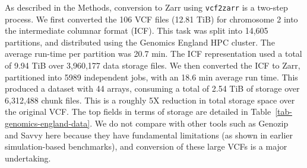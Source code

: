 \documentclass[a4paper,num-refs]{oup-contemporary}
\begin{document}
As described in the Methods, conversion to Zarr using 
\texttt{vcf2zarr} is a two-step process. We 
first converted the 106 VCF files (12.81 TiB) for chromosome 2
into the intermediate columnar format (ICF). This task was 
split into 14,605 partitions, and distributed using the Genomics England
HPC cluster. The average run-time per partition was 20.7 min.
The ICF representation used a total
of 9.94 TiB over 3,960,177 data storage files. 
We then converted the ICF to Zarr, partitioned into
5989 independent jobs, with an 18.6 min average run time.
This produced a dataset with 44 arrays, consuming a 
total of 2.54 TiB of storage over 6,312,488
chunk files. This is a roughly 5X reduction in total storage 
space over the original VCF. 
The top fields in terms 
of storage are detailed in Table~\ref{tab-genomics-england-data}.
We do not compare with other tools such as Genozip and 
Savvy here because  they have fundamental limitations 
(as shown in earlier simulation-based benchmarks),
and conversion of these large VCFs is a major undertaking.
\end{document}
